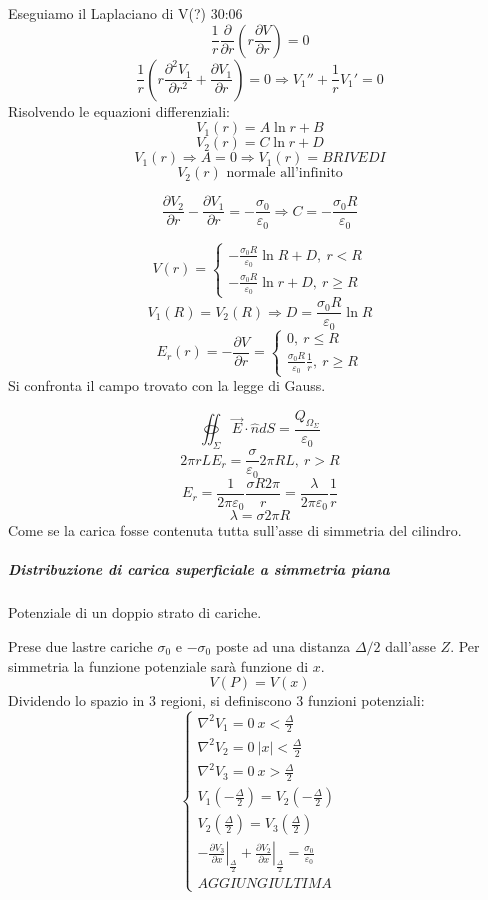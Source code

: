 Eseguiamo il Laplaciano di V(?) 30:06
$$
\frac{1}{r}\frac{\partial}{\partial r} \left(r\frac{\partial V}{\partial r}\right) = 0
$$
$$
\frac{1}{r} \left(r\frac{\partial^2 V_1}{\partial r^2}+\frac{\partial V_1}{\partial r}\right) = 0
\Rightarrow V_1'' + \frac{1}{r}V_1' = 0
$$
Risolvendo le equazioni differenziali:
$$
V_1(r) = A \ln r + B
$$
$$
V_2(r) = C \ln r + D
$$
$$
V_1(r) \Rightarrow A = 0 \Rightarrow V_1(r) = B RIVEDI
$$
$$
V_2(r) \text{ normale all'infinito} 
$$

$$
\frac{\partial V_2}{\partial r} - \frac{\partial V_1}{\partial r} = -\frac{\sigma_0}{\varepsilon_0}
\Rightarrow C = -\frac{\sigma_0 R}{\varepsilon_0}
$$

$$
V(r) = \begin{cases}
-\frac{\sigma_0 R}{\varepsilon_0} \ln R + D,\ r < R\\
-\frac{\sigma_0 R}{\varepsilon_0} \ln r + D,\ r \geq R
\end{cases}
$$
$$
V_1(R) = V_2(R)\Rightarrow D = \frac{\sigma_0 R}{\varepsilon_0} \ln R
$$
$$
E_r (r) = -\frac{\partial V}{\partial r} = \begin{cases}
0,\ r\leq R\\
\frac{\sigma_0 R}{\varepsilon_0}\frac{1}{r},\ r\geq R
\end{cases}
$$
Si confronta il campo trovato con la legge di Gauss.

$$
\oiint_\Sigma \vec{E}\cdot\hat{n}dS = \frac{Q_{\Omega_\Sigma}}{\varepsilon_0}
$$
$$
2 \pi r L E_r = \frac{\sigma}{\varepsilon_0} 2 \pi R L,\ r > R
$$
$$
E_r = \frac{1}{2 \pi \varepsilon_0} \frac{\sigma R 2 \pi}{r} = \frac{\lambda}{2\pi\varepsilon_0}\frac{1}{r}
$$
$$
\lambda = \sigma 2 \pi R
$$
Come se la carica fosse contenuta tutta sull'asse di simmetria del cilindro.


\subparagraph{Distribuzione di carica superficiale a simmetria piana}
Potenziale di un doppio strato di cariche.

Prese due lastre cariche $\sigma_0$ e $-\sigma_0$ poste ad una distanza $\Delta/2$ dall'asse $Z$.
Per simmetria la funzione potenziale sarà funzione di $x$.
$$
V(P) = V(x)
$$
Dividendo lo spazio in 3 regioni, si definiscono 3 funzioni potenziali:
$$
\begin{cases}
\nabla^2V_1 = 0\ x < \frac{\Delta}{2}\\
\nabla^2V_2 = 0\ |x| < \frac{\Delta}{2}\\
\nabla^2V_3 = 0\ x > \frac{\Delta}{2}\\
V_1(-\frac{\Delta}{2}) = V_2(-\frac{\Delta}{2}) \\
V_2(\frac{\Delta}{2}) = V_3(\frac{\Delta}{2}) \\
\left.-\frac{\partial V_3}{\partial x}\right|_{\frac{\Delta}{2}} + \left.\frac{\partial V_2}{\partial x}\right|_{\frac{\Delta}{2}} = \frac{\sigma_0}{\varepsilon_0} \\
AGGIUNGI ULTIMA
\end{cases}
$$

